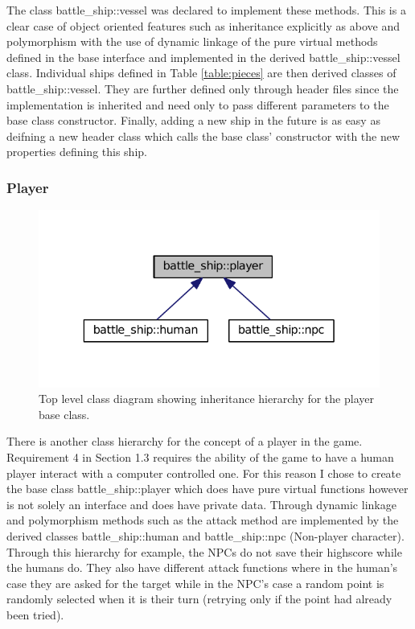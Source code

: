 \documentclass[11pt]{article} %
\begin{document}
The class battle\_ship::vessel was declared to implement these methods.
This is a clear case of object oriented features such as inheritance explicitly as above
and polymorphism with the use of dynamic linkage of the pure virtual methods defined in the base interface and implemented in the derived battle\_ship::vessel class.
Individual ships defined in Table \ref{table:pieces} are then derived classes of battle\_ship::vessel.
They are further defined only through header files since the implementation is inherited and need only to pass different parameters to the base class constructor.
Finally, adding a new ship in the future is as easy as deifning a new header class which calls the base class' constructor with the new properties defining this ship.

\subsubsection{Player}
\begin{figure}[H]
\centering
\includegraphics[scale=0.6]{images/player.pdf}
\caption{Top level class diagram showing inheritance hierarchy for the player base class.}
\label{fig:piece_class_diagram}
\end{figure}
There is another class hierarchy for the concept of a player in the game.
Requirement 4 in Section 1.3 requires the ability of the game to have a human player interact with a computer controlled one.
For this reason I chose to create the base class battle\_ship::player which does have pure virtual functions
however is not solely an interface and does have private data.
Through dynamic linkage and polymorphism methods such as the attack method are implemented by the derived classes
battle\_ship::human and battle\_ship::npc (Non-player character).
Through this hierarchy for example, the NPCs do not save their highscore while the humans do.
They also have different attack functions where in the human's case they are asked for the target
while in the NPC's case a random point is randomly selected when it is their turn (retrying only if the point had already been tried).
\end{document}
